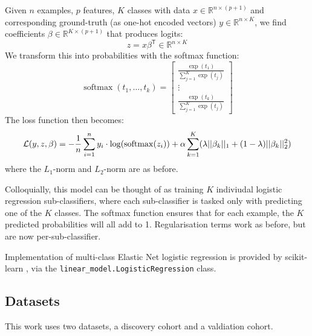 \documentclass{article}
\DeclareMathOperator*{\softmax}{softmax}
\newcommand{\equationname}[1]{%
    \begingroup
        \leavevmode
        \addcontentsline{equ}{equations}{\protect\numberline{\theequation}#1}%
    \endgroup   
}
\begin{document}
Given \(n\) examples, \(p\) features, \(K\) classes with data \(x \in \mathbb{R}^{n \times (p + 1)}\) and corresponding ground-truth (as one-hot encoded vectors) \(y \in \mathbb{R}^{n \times K}\), we find coefficients \(\beta \in \mathbb{R}^{K \times (p + 1)}\) that produces logits:
\[z = x \beta^\mathsf{T} \in \mathbb{R}^{n \times K}\]
We transform this into probabilities with the softmax function:
\[\softmax(t_1,... , t_k) =
    \begin{bmatrix}
        \frac{\exp(t_1)}{\sum_{j=1}^{K} \exp(t_j)} \\
        \vdots                                     \\
        \frac{\exp(t_k)}{\sum_{j=1}^{K} \exp(t_j)}
    \end{bmatrix}
\]
The loss function then becomes:
\begin{equation} \equationname{Elastic Net logistic regression}
    \mathcal{L}(y, z, \beta) = -\frac{1}{n}\sum_{i=1}^{n} y_i \cdot \log(\softmax(z_i)) + \alpha\sum_{k=1}^{K}(\lambda||\beta_k||_1 + (1 - \lambda)||\beta_k||_2^2)
\end{equation}
where the \(L_1\)-norm and \(L_2\)-norm are as before.

Colloquially, this model can be thought of as training \(K\) indiviudal logistic regression sub-classifiers, where each sub-classifier is tasked only with predicting one of the \(K\) classes. The softmax function ensures that for each example, the \(K\) predicted probabilities will all add to 1. Regularisation terms work as before, but are now per-sub-classifier.

Implementation of multi-class Elastic Net logistic regression is provided by scikit-learn \cite{scikit-learn}, via the \verb|linear_model.LogisticRegression| class.

\subsection{Datasets}
This work uses two datasets, a discovery cohort and a valdiation cohort.
\end{document}
